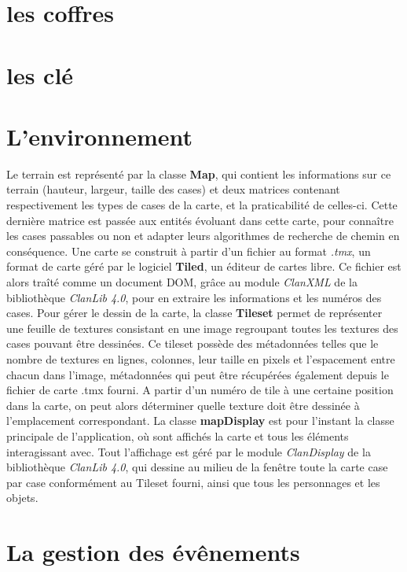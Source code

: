 \documentclass[a4paper 12pts]{article}
\begin{document}
\section{les coffres}

\section{les clé}


\section{L'environnement}

Le terrain est représenté par la classe \textbf{Map}, qui contient les informations sur ce terrain (hauteur, largeur, taille des cases) et deux matrices contenant respectivement les types de cases de la carte, et la praticabilité de celles-ci. Cette dernière matrice est passée aux entités évoluant dans cette carte, pour connaître les cases passables ou non et adapter leurs algorithmes de recherche de chemin en conséquence.
Une carte se construit à partir d'un fichier au format \emph{.tmx}, un format de carte géré par le logiciel \textbf{Tiled}, un éditeur de cartes libre. Ce fichier est alors traîté comme un document DOM, grâce au module \emph{ClanXML} de la bibliothèque \emph{ClanLib 4.0}, pour en extraire les informations et les numéros des cases.
Pour gérer le dessin de la carte, la classe \textbf{Tileset} permet de représenter une feuille de textures consistant en une image regroupant toutes les textures des cases pouvant être dessinées. Ce tileset possède des métadonnées telles que le nombre de textures en lignes, colonnes, leur taille en pixels et l'espacement entre chacun dans l'image, métadonnées qui peut être récupérées également depuis le fichier de carte .tmx fourni. A partir d'un numéro de tile à une certaine position dans la carte, on peut alors déterminer quelle texture doit être dessinée à l'emplacement correspondant. 
La classe \textbf{mapDisplay} est pour l'instant la classe principale de l'application, où sont affichés la carte et tous les éléments interagissant avec. Tout l'affichage est géré par le module \emph{ClanDisplay} de la bibliothèque \emph{ClanLib 4.0}, qui dessine au milieu de la fenêtre toute la carte case par case conformément au Tileset fourni, ainsi que tous les personnages et les objets.

\section{La gestion des évênements}
\end{document}
